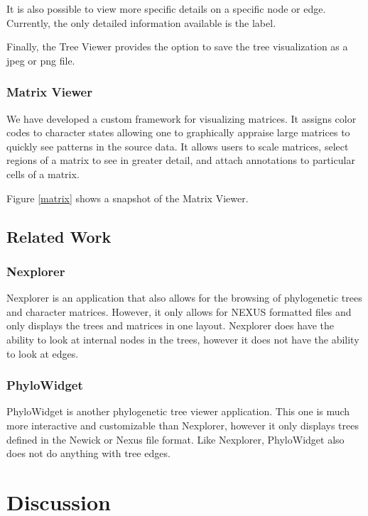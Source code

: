 \documentclass[10pt]{bmc_article}
\newenvironment{bmcformat}{\fussy\setboolean{publ}{true}}{\fussy}
\begin{document}
\begin{bmcformat}
It is also possible to view more specific details on
a specific node or edge.  Currently, the only detailed information available is
the label.  

 Finally, the Tree Viewer provides  the option to save the tree visualization as a 
 jpeg or png file.  

\subsubsection*{Matrix Viewer} We have developed  a custom
framework for visualizing matrices. It assigns color codes to character states
allowing one to graphically appraise large matrices to quickly see patterns in
the source data. It allows users to scale matrices, select regions of a matrix
to see in greater detail, and attach annotations to particular cells of a
matrix. 

Figure \ref{matrix} shows a snapshot of the Matrix Viewer.
  
\subsection*{Related Work}
\subsubsection*{Nexplorer}
Nexplorer is an application that also allows for the browsing of phylogenetic
trees and character matrices.  However, it only allows for NEXUS formatted
files and only displays the trees and matrices in one layout.  Nexplorer does
have the ability to look at internal nodes in the trees, however it does not
have the ability to look at edges.  \subsubsection*{PhyloWidget} PhyloWidget is
another phylogenetic tree viewer application.  This one is much more
interactive and customizable than Nexplorer, however it only displays trees
defined in the Newick or Nexus file format.  Like Nexplorer, PhyloWidget also
does not do anything with tree edges.

\section*{Discussion}


\end{bmcformat}
\end{document}
